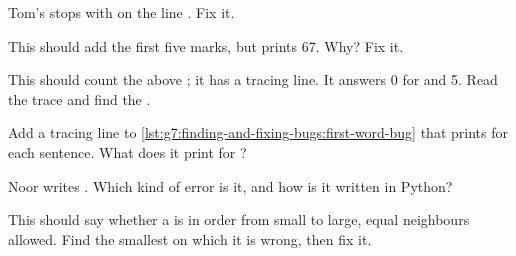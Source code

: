 \begin{exercise}[$\star$]\label{exo:g7:finding-and-fixing-bugs:4}
Tom's  stops with  on the
line . Fix it.
\end{exercise}

\begin{exercise}[$\star\star$]\label{exo:g7:finding-and-fixing-bugs:5}
This  should add the first five marks, but prints 67. Why? Fix it.

\label{lst:g7:finding-and-fixing-bugs:first-five}
\end{exercise}

\begin{exercise}[$\star\star$]\label{exo:g7:finding-and-fixing-bugs:6}
This  should count the  above ; it has a tracing
line. It answers 0 for \code{[3, 9, 7]} and 5. Read the trace and find the
.

\label{lst:g7:finding-and-fixing-bugs:count-above}

\label{out:g7:finding-and-fixing-bugs:count-above}
\end{exercise}

\begin{exercise}[$\star\star$]\label{exo:g7:finding-and-fixing-bugs:7}
Add a tracing line to \cref{lst:g7:finding-and-fixing-bugs:first-word-bug}
that prints  for each sentence. What does it print for ?
\end{exercise}

\begin{exercise}[$\star\star$]\label{exo:g7:finding-and-fixing-bugs:8}
Noor writes . Which kind of error is it, and how is it
written in Python?
\end{exercise}

\begin{exercise}[$\star\star$]\label{exo:g7:finding-and-fixing-bugs:9}
This  should say whether a  is in order from small to large,
equal neighbours allowed. Find the smallest  on which it is wrong, then
fix it.

\label{lst:g7:finding-and-fixing-bugs:is-sorted}
\end{exercise}


